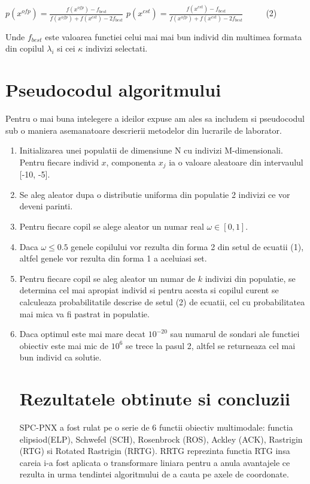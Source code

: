 \documentclass[a4paper]{article}
\begin{document}
\LARGE
\centerline{ $p(x^{ofp}) = \frac{f(x^{ofp}) - f_{best}}{f(x^{ofp}) + f(x^{cst}) - 2f_{best}}$ \hspace{1cm} $p(x^{cst}) = \frac{f(x^{cst}) - f_{best}}{f(x^{ofp}) + f(x^{cst}) - 2f_{best}}$ $ \hspace{1cm}$(2)} \vspace{5mm}

\Large
Unde $f_{best}$ este valoarea functiei celui mai mai bun individ din multimea formata din copilul $\lambda_i$ si cei $\kappa$ indivizi selectati.


\section{Pseudocodul algoritmului}
\Large
Pentru o mai buna intelegere a ideilor expuse am ales sa includem si pseudocodul sub o maniera asemanatoare descrierii metodelor din lucrarile de laborator. 

\begin{enumerate}

\item Initializarea unei populatii de dimensiune N cu indivizi M-dimensionali. Pentru fiecare individ $x$, componenta $x_j$ ia o valoare aleatoare din intervaulul [-10, -5].

\item Se aleg aleator dupa o distributie uniforma din populatie 2 indivizi ce vor deveni parinti.

\item Pentru fiecare copil se alege aleator un numar real $\omega \in [0,1]$.

\item Daca $\omega \leq 0.5$ genele copilului vor rezulta din forma 2 din setul de ecuatii (1), altfel genele vor rezulta din forma 1 a aceluiasi set.

\item Pentru fiecare copil se aleg aleator un numar de $k$ indivizi din populatie, se determina cel mai apropiat individ si pentru acesta si copilul curent se calculeaza probabilitatile descrise de setul (2) de ecuatii, cel cu probabilitatea mai mica va fi pastrat in populatie.

\item Daca optimul este mai mare decat $10^{-20}$ sau numarul de sondari ale functiei obiectiv este mai mic de $10^6$ se trece la pasul 2, altfel se returneaza cel mai bun individ ca solutie.

\newpage

\section{Rezultatele obtinute si concluzii}

\Large
SPC-PNX a fost rulat pe o serie de 6 functii obiectiv multimodale: functia elipsiod(ELP), Schwefel (SCH), Rosenbrock (ROS), Ackley (ACK), Rastrigin (RTG) si Rotated Rastrigin (RRTG). RRTG reprezinta functia RTG insa careia i-a fost aplicata o transformare liniara pentru a anula avantajele ce rezulta in urma tendintei algoritmului de a cauta pe axele de coordonate.



\end{enumerate}
\end{document}
